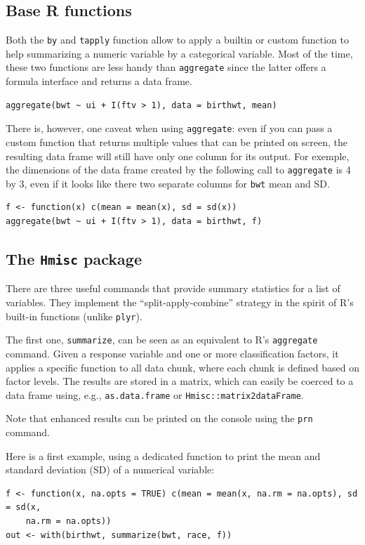 \documentclass[a4paper,twoside]{book}
\renewcommand{\texttt}[1]{\lstinline{#1}}
\begin{document}
\subsection{Base R functions}
Both the \texttt{by} and \texttt{tapply} function allow to apply a builtin
or custom function to help summarizing a numeric variable by a categorical
variable. Most of the time, these two functions are less handy than
\texttt{aggregate} since the latter offers a formula interface and returns a
data frame. 

\begin{verbatim}
aggregate(bwt ~ ui + I(ftv > 1), data = birthwt, mean)
\end{verbatim}

There is, however, one caveat when using \texttt{aggregate}: even if you can pass a
custom function that returns multiple values that can be printed on screen,
the resulting data frame will still have only one column for its output. For
exemple, the dimensions of the data frame created by the following call to
\texttt{aggregate} is 4 by 3, even if it looks like there two separate
columns for \texttt{bwt} mean and SD.

\begin{verbatim}
f <- function(x) c(mean = mean(x), sd = sd(x))
aggregate(bwt ~ ui + I(ftv > 1), data = birthwt, f)
\end{verbatim}


\subsection{The \texttt{Hmisc} package}

There are three useful commands that provide summary statistics for a list
of variables. They implement the ``split-apply-combine''
strategy\autocite{wickham11} in the spirit of R's built-in functions (unlike
\texttt{plyr}). 

The first one, \texttt{summarize}, can be seen as an equivalent to R's
\texttt{aggregate} command. Given a response variable and one or more
classification factors, it applies a specific function to all data chunk,
where each chunk is defined based on factor levels. The results are stored
in a matrix, which can easily be coerced to a data frame
using, e.g., \texttt{as.data.frame} or \texttt{Hmisc::matrix2dataFrame}. 

Note that enhanced results can be printed on the console using the
\texttt{prn} command. 

Here is a first example, using a dedicated function to print the mean and
standard deviation (SD) of a numerical variable:
\begin{verbatim}
f <- function(x, na.opts = TRUE) c(mean = mean(x, na.rm = na.opts), sd = sd(x, 
    na.rm = na.opts))
out <- with(birthwt, summarize(bwt, race, f))
\end{verbatim}
\end{document}
